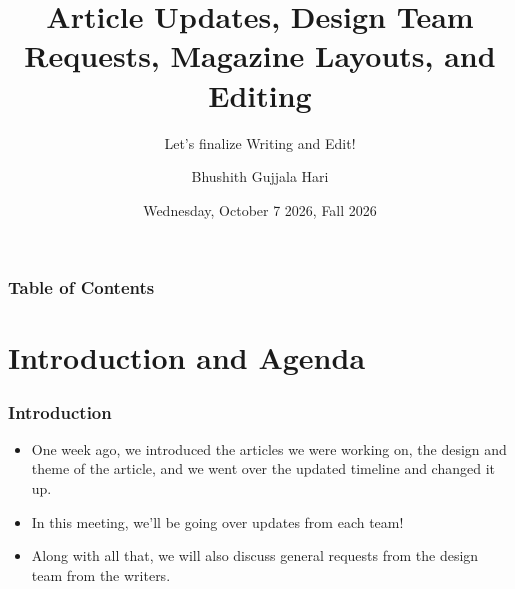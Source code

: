\documentclass{beamer}
\title[NestedOwls CS Magazine]{Article Updates, Design Team Requests, Magazine Layouts, and Editing}
\subtitle{Let's finalize Writing and Edit!}
\author{Bhushith Gujjala Hari}
\institute{Temple University Japan}
\date[Fall 2026]{Wednesday, October 7 2026, Fall 2026}
\begin{document}



\frame{\titlepage}


\begin{frame}
    \frametitle{Table of Contents}
    \tableofcontents
\end{frame}


\section{Introduction and Agenda}
\begin{frame}
    \frametitle{Introduction}
    
    \begin{itemize}
        \item<1-> One week ago, we introduced the articles we were working on, the design and theme of the article, and we went over the updated timeline and changed it up. 

        \item<2-> In this meeting, we'll be going over updates from each team! 

        \item<3-> Along with all that, we will also discuss general requests from the design team from the writers. 

    \end{itemize}

\end{frame}


\end{document}
